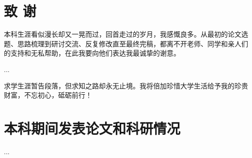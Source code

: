 \documentclass[openany,oneside]{book}
\begin{document}
	\chapter*{致 \qquad 谢}
	\thispagestyle{empty}
	本科生涯看似漫长却又一晃而过，回首走过的岁月，我感慨良多。从最初的论文选题、思路梳理到研讨交流、反复修改直至最终完稿，都离不开老师、同学和亲人们的支持和无私帮助，在此我要向他们表达我最诚挚的谢意。
	
	...
	
	求学生涯暂告段落，但求知之路却永无止境。我将倍加珍惜大学生活给予我的珍贵财富，不忘初心，砥砺前行！
	\chapter*{本科期间发表论文和科研情况}
	\thispagestyle{empty}
	
	...
	
\end{document}
